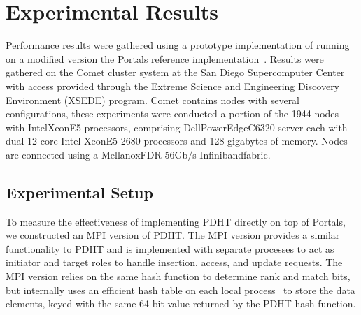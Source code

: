 \section{Experimental Results}




Performance results were gathered using a prototype implementation of \pdht
running on a modified version the Portals reference
implementation~\cite{portals-code}. Results were gathered on the Comet cluster
system at the San Diego Supercomputer Center with access provided through the
Extreme Science and Engineering Discovery Environment (XSEDE) program. Comet
contains nodes with several configurations, these experiments were conducted a
portion of the 1944 nodes with Intel\regtm Xeon\regtm E5 processors, comprising
Dell\othertm PowerEdge\othertm C6320 server each with dual 12-core Intel\regtm
Xeon\regtm E5-2680 processors and 128 gigabytes of memory. Nodes are connected
using a Mellanox\othertm FDR 56Gb/s Infiniband\othertm fabric.

\subsection{Experimental Setup}

To measure the effectiveness of implementing PDHT directly on top of Portals,
we constructed an MPI version of PDHT. The MPI version provides a similar
functionality to PDHT and is implemented with separate processes to act as
initiator and target roles to handle insertion, access, and update requests.
The MPI version relies on the same hash function to determine rank and match
bits, but internally uses an efficient hash table on each local
process~\cite{uthash} to store the data elements, keyed with the same 64-bit
value returned by the PDHT hash function. 


